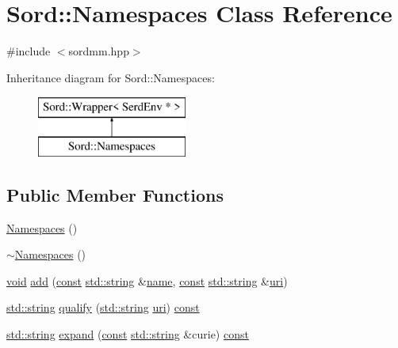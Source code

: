 \hypertarget{class_sord_1_1_namespaces}{}\section{Sord\+:\+:Namespaces Class Reference}
\label{class_sord_1_1_namespaces}


{\ttfamily \#include $<$sordmm.\+hpp$>$}

Inheritance diagram for Sord\+:\+:Namespaces\+:\begin{figure}[H]
\begin{center}
\leavevmode
\includegraphics[height=2.000000cm]{class_sord_1_1_namespaces}
\end{center}
\end{figure}
\subsection*{Public Member Functions}
\begin{DoxyCompactItemize}
\item 
\hyperlink{class_sord_1_1_namespaces_af1eea418e8edb728f8d848681e8b3841}{Namespaces} ()
\item 
\hyperlink{class_sord_1_1_namespaces_a335e5c1568038799eb898f9cc5896d28}{$\sim$\+Namespaces} ()
\item 
\hyperlink{sound_8c_ae35f5844602719cf66324f4de2a658b3}{void} \hyperlink{class_sord_1_1_namespaces_a01b3b4f4a8510eb416f974a2ff7f7928}{add} (\hyperlink{getopt1_8c_a2c212835823e3c54a8ab6d95c652660e}{const} \hyperlink{test__lib_f_l_a_c_2format_8c_ab02026ad0de9fb6c1b4233deb0a00c75}{std\+::string} \&\hyperlink{lib_2expat_8h_a1b49b495b59f9e73205b69ad1a2965b0}{name}, \hyperlink{getopt1_8c_a2c212835823e3c54a8ab6d95c652660e}{const} \hyperlink{test__lib_f_l_a_c_2format_8c_ab02026ad0de9fb6c1b4233deb0a00c75}{std\+::string} \&\hyperlink{lib_2expat_8h_a5a9fdd6c2606370ad12f24c078ac6585}{uri})
\item 
\hyperlink{test__lib_f_l_a_c_2format_8c_ab02026ad0de9fb6c1b4233deb0a00c75}{std\+::string} \hyperlink{class_sord_1_1_namespaces_ab0a6a4b7ee3ca6095ae035b65ed3a860}{qualify} (\hyperlink{test__lib_f_l_a_c_2format_8c_ab02026ad0de9fb6c1b4233deb0a00c75}{std\+::string} \hyperlink{lib_2expat_8h_a5a9fdd6c2606370ad12f24c078ac6585}{uri}) \hyperlink{getopt1_8c_a2c212835823e3c54a8ab6d95c652660e}{const} 
\item 
\hyperlink{test__lib_f_l_a_c_2format_8c_ab02026ad0de9fb6c1b4233deb0a00c75}{std\+::string} \hyperlink{class_sord_1_1_namespaces_a5f5081de539a7696488fba52384ff0f6}{expand} (\hyperlink{getopt1_8c_a2c212835823e3c54a8ab6d95c652660e}{const} \hyperlink{test__lib_f_l_a_c_2format_8c_ab02026ad0de9fb6c1b4233deb0a00c75}{std\+::string} \&curie) \hyperlink{getopt1_8c_a2c212835823e3c54a8ab6d95c652660e}{const} 
\end{DoxyCompactItemize}
